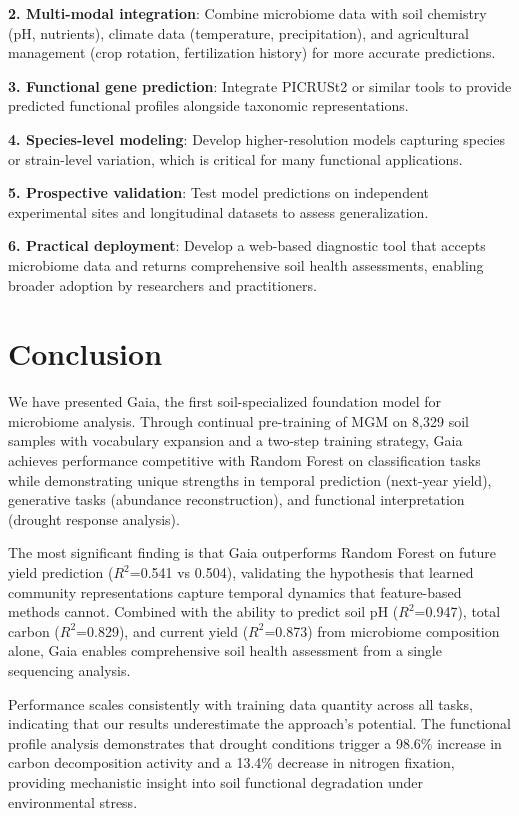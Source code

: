 \documentclass[11pt,a4paper]{article}
\begin{document}
\textbf{2. Multi-modal integration}: Combine microbiome data with soil chemistry (pH, nutrients), climate data (temperature, precipitation), and agricultural management (crop rotation, fertilization history) for more accurate predictions.

\textbf{3. Functional gene prediction}: Integrate PICRUSt2 or similar tools to provide predicted functional profiles alongside taxonomic representations.

\textbf{4. Species-level modeling}: Develop higher-resolution models capturing species or strain-level variation, which is critical for many functional applications.

\textbf{5. Prospective validation}: Test model predictions on independent experimental sites and longitudinal datasets to assess generalization.

\textbf{6. Practical deployment}: Develop a web-based diagnostic tool that accepts microbiome data and returns comprehensive soil health assessments, enabling broader adoption by researchers and practitioners.

\section{Conclusion}

We have presented Gaia, the first soil-specialized foundation model for microbiome analysis. Through continual pre-training of MGM on 8,329 soil samples with vocabulary expansion and a two-step training strategy, Gaia achieves performance competitive with Random Forest on classification tasks while demonstrating unique strengths in temporal prediction (next-year yield), generative tasks (abundance reconstruction), and functional interpretation (drought response analysis).

The most significant finding is that Gaia outperforms Random Forest on future yield prediction ($R^2$=0.541 vs 0.504), validating the hypothesis that learned community representations capture temporal dynamics that feature-based methods cannot. Combined with the ability to predict soil pH ($R^2$=0.947), total carbon ($R^2$=0.829), and current yield ($R^2$=0.873) from microbiome composition alone, Gaia enables comprehensive soil health assessment from a single sequencing analysis.

Performance scales consistently with training data quantity across all tasks, indicating that our results underestimate the approach's potential. The functional profile analysis demonstrates that drought conditions trigger a 98.6\% increase in carbon decomposition activity and a 13.4\% decrease in nitrogen fixation, providing mechanistic insight into soil functional degradation under environmental stress.
\end{document}
